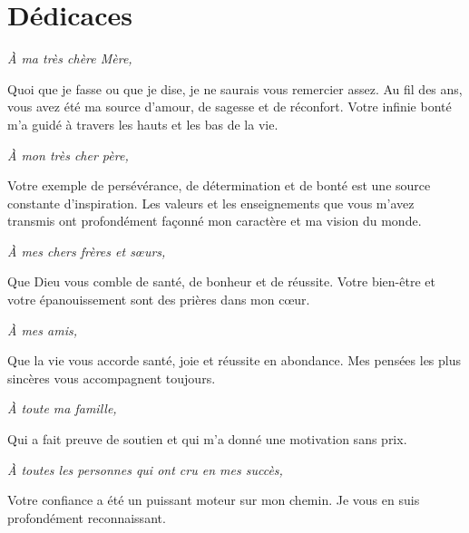 \documentclass[12pt,a4paper]{report}
\newcommand{\preliminarymark}[1]{\markboth{\MakeUppercase{#1}}{}}
\begin{document}
\chapter*{Dédicaces}
\preliminarymark{}
\thispagestyle{plain}

\begin{center}
\vspace*{\fill}

{\large\textit{À ma très chère Mère,}}

\vspace{0.5cm}

Quoi que je fasse ou que je dise, je ne saurais vous remercier assez. Au fil des ans, vous avez été ma source d'amour, de sagesse et de réconfort. Votre infinie bonté m'a guidé à travers les hauts et les bas de la vie.

\vspace{0.8cm}

{\large\textit{À mon très cher père,}}

\vspace{0.5cm}

Votre exemple de persévérance, de détermination et de bonté est une source constante d'inspiration. Les valeurs et les enseignements que vous m'avez transmis ont profondément façonné mon caractère et ma vision du monde.

\vspace{0.8cm}

{\large\textit{À mes chers frères et sœurs,}}

\vspace{0.5cm}

Que Dieu vous comble de santé, de bonheur et de réussite. Votre bien-être et votre épanouissement sont des prières dans mon cœur.

\vspace{0.8cm}

{\large\textit{À mes amis,}}

\vspace{0.5cm}

Que la vie vous accorde santé, joie et réussite en abondance. Mes pensées les plus sincères vous accompagnent toujours.

\vspace{0.8cm}

{\large\textit{À toute ma famille,}}

\vspace{0.5cm}

Qui a fait preuve de soutien et qui m'a donné une motivation sans prix.

\vspace{0.8cm}

{\large\textit{À toutes les personnes qui ont cru en mes succès,}}

\vspace{0.5cm}

Votre confiance a été un puissant moteur sur mon chemin. Je vous en suis profondément reconnaissant.

\vspace*{\fill}
\end{center}
\newpage
\end{document}
